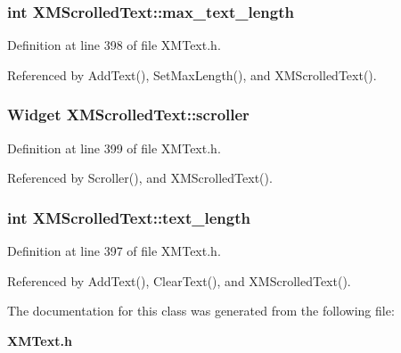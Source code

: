 \subsubsection{\setlength{\rightskip}{0pt plus 5cm}int XMScrolled\-Text::max\_\-text\_\-length\hspace{0.3cm}{\tt  [protected]}}\label{classXMScrolledText_n1}




Definition at line 398 of file XMText.h.

Referenced by Add\-Text(), Set\-Max\-Length(), and XMScrolled\-Text().
\subsubsection{\setlength{\rightskip}{0pt plus 5cm}Widget XMScrolled\-Text::scroller\hspace{0.3cm}{\tt  [protected]}}\label{classXMScrolledText_n2}




Definition at line 399 of file XMText.h.

Referenced by Scroller(), and XMScrolled\-Text().
\subsubsection{\setlength{\rightskip}{0pt plus 5cm}int XMScrolled\-Text::text\_\-length\hspace{0.3cm}{\tt  [protected]}}\label{classXMScrolledText_n0}




Definition at line 397 of file XMText.h.

Referenced by Add\-Text(), Clear\-Text(), and XMScrolled\-Text().

The documentation for this class was generated from the following file:\begin{CompactItemize}
\item 
{\bf XMText.h}\end{CompactItemize}
